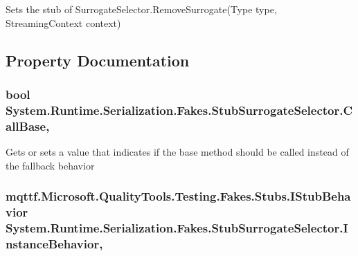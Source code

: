 Sets the stub of Surrogate\-Selector.\-Remove\-Surrogate(\-Type type, Streaming\-Context context)



\subsection{Property Documentation}
\hypertarget{class_system_1_1_runtime_1_1_serialization_1_1_fakes_1_1_stub_surrogate_selector_ad0f1d1b9ae3dae0397132ca1de4a0c6e}{
\subsubsection[{Call\-Base}]{\setlength{\rightskip}{0pt plus 5cm}bool System.\-Runtime.\-Serialization.\-Fakes.\-Stub\-Surrogate\-Selector.\-Call\-Base\hspace{0.3cm}{\ttfamily [get]}, {\ttfamily [set]}}}\label{class_system_1_1_runtime_1_1_serialization_1_1_fakes_1_1_stub_surrogate_selector_ad0f1d1b9ae3dae0397132ca1de4a0c6e}


Gets or sets a value that indicates if the base method should be called instead of the fallback behavior

\hypertarget{class_system_1_1_runtime_1_1_serialization_1_1_fakes_1_1_stub_surrogate_selector_a7118167ca82f4ee334eac5f08baf6f80}{
\subsubsection[{Instance\-Behavior}]{\setlength{\rightskip}{0pt plus 5cm}mqttf.\-Microsoft.\-Quality\-Tools.\-Testing.\-Fakes.\-Stubs.\-I\-Stub\-Behavior System.\-Runtime.\-Serialization.\-Fakes.\-Stub\-Surrogate\-Selector.\-Instance\-Behavior\hspace{0.3cm}{\ttfamily [get]}, {\ttfamily [set]}}}\label{class_system_1_1_runtime_1_1_serialization_1_1_fakes_1_1_stub_surrogate_selector_a7118167ca82f4ee334eac5f08baf6f80}


